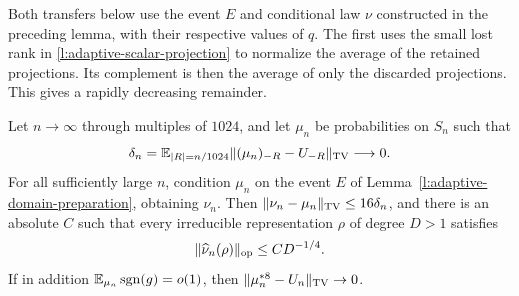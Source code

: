 Both transfers below use the event $E$ and conditional law $\nu$
constructed in the preceding lemma, with their respective values of $q$.
The first uses the small lost rank in
\eqref{l:adaptive-scalar-projection} to normalize the average of the
retained projections. Its complement is then the average of only the
discarded projections. This gives a rapidly decreasing remainder.

\begin{theorem}
\label{l:omitted-set-transfer}
Let $n\to\infty$ through multiples of $1024$, and let $\mu_n$ be
probabilities on $S_n$ such that
\[
 \delta_n=\mathbb E_{|R|=n/1024}
       \|(\mu_n)_{-R}-U_{-R}\|_{\mathrm{TV}}\longrightarrow0.
\]
For all sufficiently large $n$, condition $\mu_n$ on the event $E$
of Lemma~\ref{l:adaptive-domain-preparation}, obtaining $\nu_n$.
Then $\|\nu_n-\mu_n\|_{\mathrm{TV}}\le16\delta_n$, and there is an absolute
$C$ such that every irreducible representation $\rho$ of degree $D>1$
satisfies
\[
 \|\widehat\nu_n(\rho)\|_{\mathrm{op}}\le CD^{-1/4}.
\]
If in addition $\mathbb E_{\mu_n}\operatorname{sgn}(g)=o(1)$, then
$\|\mu_n^{*8}-U_n\|_{\mathrm{TV}}\to0$.
\end{theorem}

